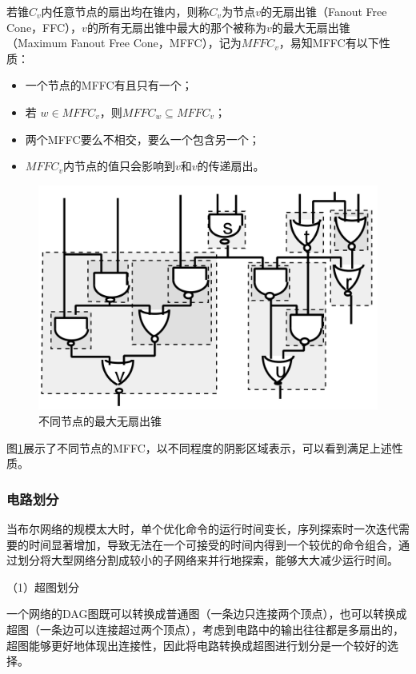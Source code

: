 若锥$C_v$内任意节点的扇出均在锥内，则称$C_v$为节点$v$的无扇出锥（Fanout Free Cone，FFC），$v$的所有无扇出锥中最大的那个被称为$v$的最大无扇出锥（Maximum Fanout Free Cone，MFFC），记为$MFFC_v$，易知MFFC有以下性质\cite{LS:exact_rewriting,FPGA:Jason_Cong_1993,FPGA:Jason_Cong_patition}：
\begin{itemize}
    \item 一个节点的MFFC有且只有一个；
    \item 若 $w \in MFFC_v$，则$MFFC_w \subseteq MFFC_v$；
    \item 两个MFFC要么不相交，要么一个包含另一个；
    \item $MFFC_v$内节点的值只会影响到$v$和$v$的传递扇出。
\end{itemize}
\begin{figure}[!htbp]
    \centering
    \includegraphics[width=0.6\linewidth]{./figs/LS-MFFC.png}
    \caption{不同节点的最大无扇出锥}
    \label{LS:MFFC}
\end{figure}
图\ref{LS:MFFC}展示了不同节点的MFFC，以不同程度的阴影区域表示，可以看到满足上述性质。


\subsubsection{电路划分}

当布尔网络的规模太大时，单个优化命令的运行时间变长，序列探索时一次迭代需要的时间显著增加，导致无法在一个可接受的时间内得到一个较优的命令组合，通过划分将大型网络分割成较小的子网络来并行地探索，能够大大减少运行时间。

（1）超图划分

一个网络的DAG图既可以转换成普通图（一条边只连接两个顶点），也可以转换成超图（一条边可以连接超过两个顶点），考虑到电路中的输出往往都是多扇出的，超图能够更好地体现出连接性，因此将电路转换成超图进行划分是一个较好的选择\cite{LS:LSOracle}。

